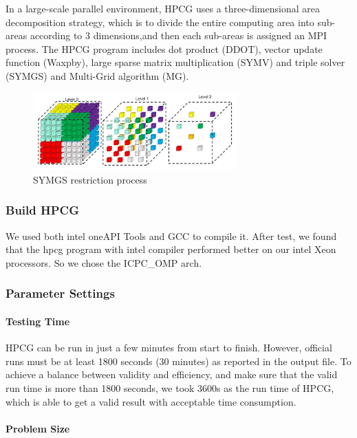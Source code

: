 \documentclass[a4paper,12pt]{article}
\begin{document}
In a large-scale parallel environment, HPCG uses a three-dimensional area decomposition strategy, which is to divide the entire computing area into sub-areas according to 3 dimensions,and then each sub-areas is assigned an MPI process. The HPCG program includes dot product (DDOT), vector update function (Waxpby), large sparse matrix multiplication (SYMV) and triple solver (SYMGS) and Multi-Grid algorithm (MG).

\begin{figure}[H]
    \centering
    \includegraphics[width=0.7\textwidth]{images/algorithm/SYMGS_restriction_process.png}
    \caption{SYMGS restriction process}
    \label{fig:symgs_restriction}
\end{figure}

\subsubsection{Build HPCG}

We used both intel oneAPI Tools and GCC to compile it. After test, we found that the hpcg program with intel compiler performed better on our intel Xeon processors. So we chose the ICPC\_OMP arch.

\subsubsection{Parameter Settings}

\paragraph{Testing Time}

HPCG can be run in just a few minutes from start to finish. However, official runs must be at least 1800 seconds (30 minutes) as reported in the output file. To achieve a balance between validity and efficiency, and make sure that the valid run time is more than 1800 seconds, we took 3600s as the run time of HPCG, which is able to get a valid result with acceptable time consumption.

\paragraph{Problem Size}
\end{document}
